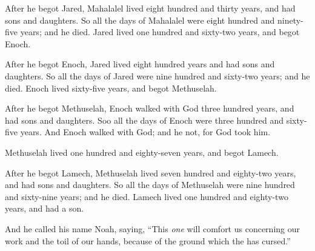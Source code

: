 \bverse After he begot Jared, Mahalalel lived eight hundred and thirty years, and had sons and daughters. 
\bverse So all the days of Mahalalel were eight hundred and ninety-five years; and he died.
\bverse Jared lived one hundred and sixty-two years, and begot Enoch.
	
\bverse After he begot Enoch, Jared lived eight hundred years and had sons and daughters.
\bverse So all the days of Jared were nine hundred and sixty-two years; and he died.
\bverse Enoch lived sixty-five years, and begot Methuselah.
	
\bverse After he begot Methuselah, Enoch walked with God three hundred years, and had sons and daughters.
\bverse Soo all the days of Enoch were three hundred and sixty-five years.
\bverse And Enoch walked with God; and he \was not, for God took him.

\bverse Methuselah lived one hundred and eighty-seven years, and begot Lamech.
	
\bverse After he begot Lamech, Methuselah lived seven hundred and eighty-two years, and had sons and daughters.
\bverse So all the days of Methuselah were nine hundred and sixty-nine years; and he died.
\bverse Lamech lived one hundred and eighty-two years, and had a son.
	
\bverse And he called his name Noah, saying, ``This \textit{one} will comfort us concerning our work and the toil of our hands, because of the ground which the \lord has cursed.''
	
